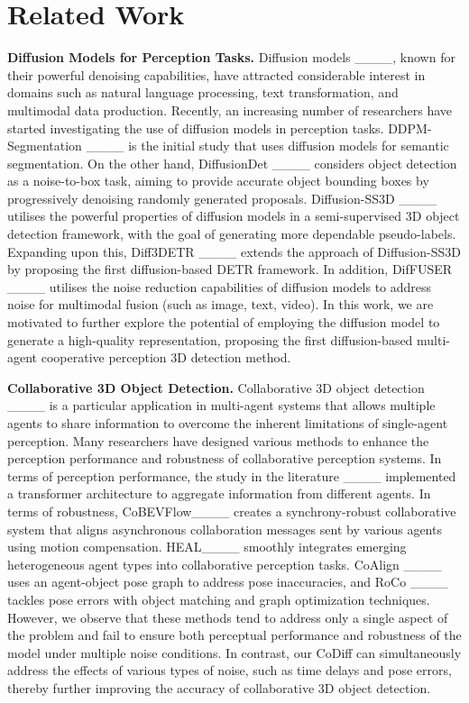 \section{Related Work}
\textbf{Diffusion Models for Perception Tasks.}
Diffusion models ____, known for their powerful denoising capabilities, have attracted considerable interest in domains such as natural language processing, text transformation, and multimodal data production. Recently, an increasing number of researchers have started investigating the use of diffusion models in perception tasks. DDPM-Segmentation ____ is the initial study that uses diffusion models for semantic segmentation. On the other hand, DiffusionDet ____ considers object detection as a noise-to-box task, aiming to provide accurate object bounding boxes by progressively denoising randomly generated proposals. Diffusion-SS3D ____ utilises the powerful properties of diffusion models in a semi-supervised 3D object detection framework, with the goal of generating more dependable pseudo-labels. Expanding upon this, Diff3DETR ____ extends the approach of Diffusion-SS3D by proposing the first diffusion-based DETR framework.
In addition, DifFUSER ____ utilises the noise reduction capabilities of diffusion models to address noise for multimodal fusion (such as image, text, video).
In this work, we are motivated to further explore the potential of employing
the diffusion model to generate a high-quality representation, proposing the first diffusion-based multi-agent cooperative perception 3D detection method.

\textbf{Collaborative 3D Object Detection.}
Collaborative 3D object detection ____ is a particular application in multi-agent systems that allows multiple agents to share information to overcome the inherent limitations of single-agent perception.
Many researchers have designed various methods to enhance the perception performance and robustness of collaborative perception systems. 
In terms of perception performance, the study in the literature  ____ implemented a transformer architecture to aggregate information from different agents.
In terms of robustness, CoBEVFlow____ creates a synchrony-robust collaborative system that aligns asynchronous collaboration messages sent by various agents using motion compensation. HEAL____ smoothly integrates  emerging heterogeneous agent types into collaborative perception tasks. CoAlign ____ uses an agent-object pose graph to address pose inaccuracies, and RoCo ____ tackles  pose errors with object matching and graph optimization techniques.
However, we observe that these methods tend to address only a single aspect of the problem and fail to ensure both perceptual performance and robustness of the model under multiple noise conditions. In contrast, our CoDiff can simultaneously address the effects of various types of noise, such as time delays and pose errors, thereby further improving the accuracy of collaborative 3D object detection.



